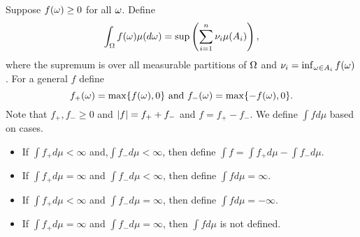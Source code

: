 \begin{defn}
    Suppose $f({\omega}) \ge 0$ for all ${\omega}$. Define
    \[\int_{{\Omega}} f({\omega})\mu(d{\omega}) = \sup\left(\sum_{i=1}^n \nu_i \mu(A_i)\right), \]
    where the supremum is over all measurable partitions of ${{\Omega}}$ and $\nu_i = \inf_{{\omega} \in A_i} f({\omega})$. For a general $f$ define
    \[f_+({\omega}) = \max\{f({\omega}),0\} \text{ and } f_-({\omega}) = \max\{-f({\omega}),0\}. \]
    Note that $f_+, f_-\ge 0$ and ${\left\lvert f\right\rvert} = f_+ +f_-$ and $f = f_+ -f_-$. We define $\int f d\mu$ based on cases.
    \begin{itemize}
        \item If $\int f_+ d\mu < \infty$ and,$\int f_- d\mu < \infty$, then define $\int f = \int f_+d\mu - \int f_-d\mu$. 
        \item If $\int f_+ d\mu = \infty$ and $\int f_- d\mu < \infty$, then define $\int fd\mu = \infty$.
        \item If $\int f_+ d\mu < \infty$ and $\int f_- d\mu = \infty$, then define $\int fd\mu = - \infty$.
        \item If $\int f_+ d\mu = \infty$ and $\int f_- d\mu = \infty$, then $\int f d\mu$ is not defined. 
    \end{itemize}

\end{defn}
